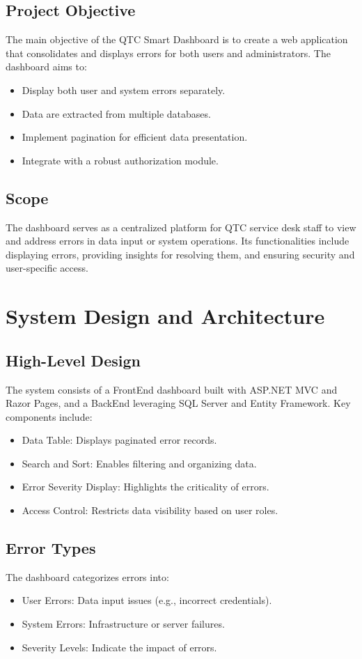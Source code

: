 \documentclass[12pt]{article}
\begin{document}
\subsection{Project Objective}
The main objective of the QTC Smart Dashboard is to create a web application that consolidates and displays errors for both users and administrators. The dashboard aims to:
\begin{itemize}
    \item Display both user and system errors separately.
    \item Data are extracted from multiple databases.
    \item Implement pagination for efficient data presentation.
    \item Integrate with a robust authorization module.
\end{itemize}

\subsection{Scope}
The dashboard serves as a centralized platform for QTC service desk staff to view and address errors in data input or system operations. Its functionalities include displaying errors, providing insights for resolving them, and ensuring security and user-specific access.

\section{System Design and Architecture}
\subsection{High-Level Design}
The system consists of a FrontEnd dashboard built with ASP.NET MVC and Razor Pages, and a BackEnd leveraging SQL Server and Entity Framework. Key components include:
\begin{itemize}
    \item Data Table: Displays paginated error records.
    \item Search and Sort: Enables filtering and organizing data.
    \item Error Severity Display: Highlights the criticality of errors.
    \item Access Control: Restricts data visibility based on user roles.
\end{itemize}

\subsection{Error Types}
The dashboard categorizes errors into:
\begin{itemize}
    \item User Errors: Data input issues (e.g., incorrect credentials).
    \item System Errors: Infrastructure or server failures.
    \item Severity Levels: Indicate the impact of errors.
\end{itemize}
\end{document}
